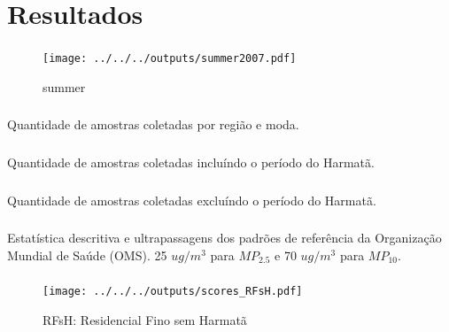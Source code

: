 \section{Resultados}

\begin{frame}
  \frametitle{}
  \begin{figure}[H]
   \centering
    \caption{summer}
    \texttt{[image: ../../../outputs/summer2007.pdf]}
  \end{figure}
\end{frame}

\begin{frame}
  \frametitle{}
  \begin{table}
    
    \caption{Quantidade de amostras coletadas por região e moda.}
  \end{table}
\end{frame}

\begin{frame}
  \frametitle{}
  \begin{table}
    
    \caption{Quantidade de amostras coletadas incluíndo o período do Harmatã.}
  \end{table}
\end{frame}

\begin{frame}
  \frametitle{}
  \begin{table}
    
    \caption{Quantidade de amostras coletadas excluíndo o período do Harmatã.}
  \end{table}
\end{frame}

\begin{frame}
  \frametitle{}
  \begin{table}
    
    \caption{Estatística descritiva e ultrapassagens dos padrões de referência 
             da Organização Mundial de Saúde (OMS). 25 $ug/m^3$ para $MP_{2.5}$ e 70 $ug/m^3$ para $MP_{10}$.}
  \end{table}
\end{frame}

\begin{frame}
  \frametitle{}
    
\end{frame}

\begin{frame}
  \frametitle{}
  \begin{figure}[H]
   \centering
    \caption{RFsH: Residencial Fino sem Harmatã}
    \texttt{[image: ../../../outputs/scores\_RFsH.pdf]}
  \end{figure}
\end{frame}


